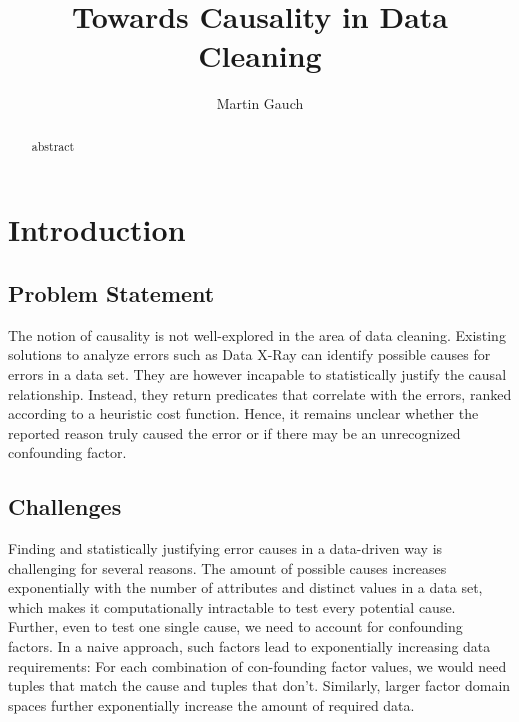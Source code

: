 \documentclass[acmsmall, nonacm, screen]{acmart} %
\begin{document}
\title{Towards Causality in Data Cleaning}

\author{Martin Gauch}

\begin{abstract}
abstract\\
\end{abstract}


\maketitle

\section{Introduction}

\subsection{Problem Statement}

The notion of causality is not well-explored in the area of data cleaning. 
Existing solutions to analyze errors such as Data X-Ray \cite{Wang15} can identify possible causes for errors in a data set. They are however incapable to statistically justify the causal relationship. 
Instead, they return predicates that correlate with the errors, ranked according to a heuristic cost function. 
Hence, it remains unclear whether the reported reason truly caused the error or if there may be an unrecognized confounding factor.

\subsection{Challenges}
Finding and statistically justifying error causes in a data-driven way is challenging for several reasons. 
The amount of possible causes increases exponentially with the number of attributes and distinct values in a data set, which makes it computationally intractable to test every potential cause.\\

Further, even to test one single cause, we need to account for confounding factors. In a naive approach, such factors lead to exponentially increasing data requirements:
For each combination of con-founding factor values, we would need tuples that match the cause and tuples that don't. Similarly, larger factor domain spaces further exponentially increase the amount of required data.
\end{document}
